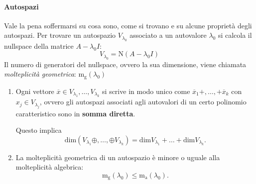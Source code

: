 \documentclass[x11names]{article}
\begin{document}
\paragraph{Autospazi} Vale la pena soffermarsi su cosa sono, come si trovano e su alcune proprietà degli autospazi.
Per trovare un autospazio $V_{\lambda_{0}}$ associato a un autovalore $\lambda_{0}$ si calcola il nullspace della matrice $A-\lambda_{0} I$:
 \[
	 V_{\lambda_{0}} = \text{N}\left(A-\lambda_{0} I\right)
\]
\noindent
Il numero di generatori del nullspace, ovvero la sua dimensione, viene chiamata \textit{molteplicità geometrica}: $\text{m}_{\text{g}}\left(\lambda_{0}\right)$

\begin{enumerate}
	\item Ogni vettore $\overline{x} \in V_{\lambda_{1}},\dots,V_{\lambda_{k}}$ si scrive in modo unico come $\overline{x}_{1} +, \dots,+ \overline{x}_{k}$ con $x_{j} \in V_{\lambda_{j}}$, ovvero gli autospazi associati agli autovalori di un certo polinomio caratteristico sono in \textbf{somma diretta}.

		\noindent
Questo implica 
\[
\text{dim}\left(V_{\lambda_{1}}\oplus,\dots,\oplus V_{\lambda_{k}}\right) = \text{dim}V_{\lambda_{1}} + \dots + \text{dim}V_{\lambda_{k}}
.\] 
\item La molteplicità geometrica di un autospazio è minore o uguale alla molteplicità algebrica:
	\[
	\text{m}_{\text{g}}\left(\lambda_{0}\right) \leq \text{m}_{\text{a}}\left(\lambda_{0}\right)
	.\] 
\end{enumerate}
\end{document}
